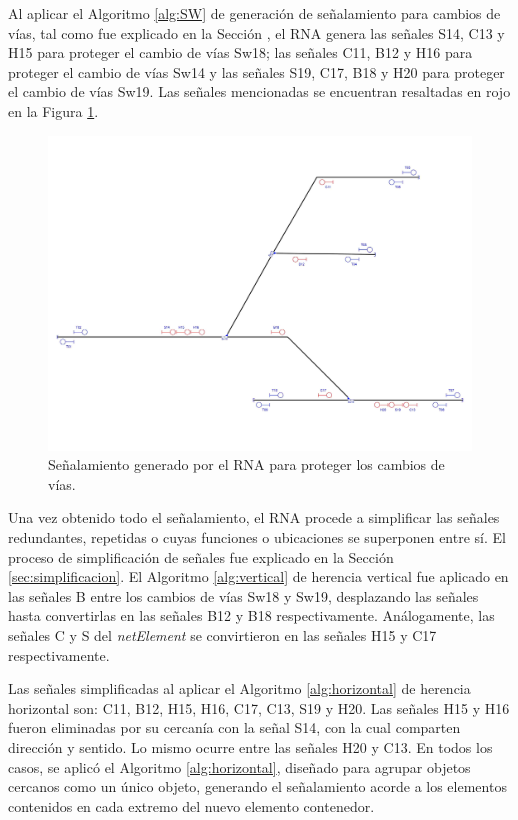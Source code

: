 	Al aplicar el Algoritmo \ref{alg:SW} de generación de señalamiento para cambios de vías, tal como fue explicado en la Sección \label{sec:signal_switches}, el RNA genera las señales S14, C13 y H15 para proteger el cambio de vías Sw18; las señales C11, B12 y H16 para proteger el cambio de vías Sw14 y las señales S19, C17, B18 y H20 para proteger el cambio de vías Sw19. Las señales mencionadas se encuentran resaltadas en rojo en la Figura \ref{fig:EJ7_6}.
	
	\begin{figure}[H]
		\centering
		\includegraphics[width=1\textwidth]{resultados-obtenidos/ejemplo7/images/7_step4.png}
		\centering\caption{Señalamiento generado por el RNA para proteger los cambios de vías.}
		\label{fig:EJ7_6}
	\end{figure}
	
	Una vez obtenido todo el señalamiento, el RNA procede a simplificar las señales redundantes, repetidas o cuyas funciones o ubicaciones se superponen entre sí. El proceso de simplificación de señales fue explicado en la Sección \ref{sec:simplificacion}. El Algoritmo \ref{alg:vertical} de herencia vertical fue aplicado en las señales B entre los cambios de vías Sw18 y Sw19, desplazando las señales hasta convertirlas en las señales B12 y B18 respectivamente. Análogamente, las señales C y S del \textit{netElement} se convirtieron en las señales H15 y C17 respectivamente.
	
	Las señales simplificadas al aplicar el Algoritmo \ref{alg:horizontal} de herencia horizontal son: C11, B12, H15, H16, C17, C13, S19 y H20. Las señales H15 y H16 fueron eliminadas por su cercanía con la señal S14, con la cual comparten dirección y sentido. Lo mismo ocurre entre las señales H20 y C13. En todos los casos, se aplicó el Algoritmo \ref{alg:horizontal}, diseñado para agrupar objetos cercanos como un único objeto, generando el señalamiento acorde a los elementos contenidos en cada extremo del nuevo elemento contenedor.
	
